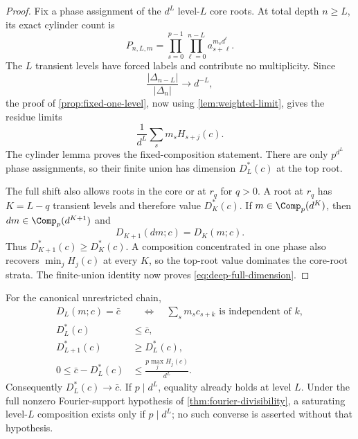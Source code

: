 \begin{proof}
Fix a phase assignment of the $d^L$ level-$L$ core roots.  At total depth
$n\geq L$, its exact cylinder count is
\begin{equation}
 P_{n,L,m}=\prod_{s=0}^{p-1}\prod_{\ell=0}^{n-L}
 a_{s+\ell}^{m_s d^\ell}.
 \label{eq:deep-prefix-count}
\end{equation}
The $L$ transient levels have forced labels and contribute no multiplicity.
Since
\begin{equation}
 \frac{|\Delta_{n-L}|}{|\Delta_n|}\longrightarrow d^{-L},
 \label{eq:deep-scale-ratio}
\end{equation}
the proof of \cref{prop:fixed-one-level}, now using
\cref{lem:weighted-limit}, gives the residue limits
\[
 \frac1{d^L}\sum_sm_sH_{s+j}(c).
\]
The cylinder lemma proves the fixed-composition statement.  There are only
$p^{d^L}$ phase assignments, so their finite union has dimension $D_L^*(c)$
at the top root.

The full shift also allows roots in the core or at $r_q$ for $q>0$.  A root
at $r_q$ has $K=L-q$ transient levels and therefore value $D_K^*(c)$.  If
$m\in\Comp_p(d^K)$, then $dm\in\Comp_p(d^{K+1})$ and
\begin{equation}
 D_{K+1}(dm;c)=D_K(m;c).
 \label{eq:grid-embedding}
\end{equation}
Thus $D_{K+1}^*(c)\geq D_K^*(c)$.  A composition concentrated in one phase
also recovers $\min_jH_j(c)$ at every $K$, so the top-root value dominates
the core-root strata.  The finite-union identity now proves
\eqref{eq:deep-full-dimension}.
\end{proof}

\begin{theorem}
\label{thm:deep-convergence}
For the canonical unrestricted chain,
\begin{align}
 D_L(m;c)=\bar c
 &\quad\Longleftrightarrow\quad
 \sum_sm_sc_{s+k}\text{ is independent of }k,
 \label{eq:DL-saturation}\\
 D_L^*(c)&\leq\bar c,
 \label{eq:DL-upper}\\
 D_{L+1}^*(c)&\geq D_L^*(c),
 \label{eq:DL-monotone}\\
 0\leq\bar c-D_L^*(c)
 &\leq\frac{p\max_jH_j(c)}{d^L}.
 \label{eq:DL-rate}
\end{align}
Consequently $D_L^*(c)\to\bar c$.  If $p\mid d^L$, equality already holds
at level $L$.  Under the full nonzero Fourier-support hypothesis of
\cref{thm:fourier-divisibility}, a saturating level-$L$ composition exists
only if $p\mid d^L$; no such converse is asserted without that hypothesis.
\end{theorem}

